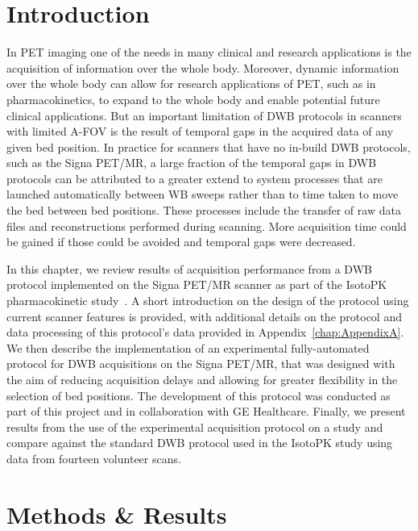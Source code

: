 \section{Introduction}
In PET imaging one of the needs in many clinical and research applications is the acquisition of information over the whole body. Moreover, dynamic information over the whole body can allow for research applications of PET, such as in pharmacokinetics, to expand to the whole body and enable potential future clinical applications. 
But an important limitation of DWB protocols in scanners with limited A-FOV is the result of temporal gaps in the acquired data of any given bed position.
In practice for scanners that have no in-build DWB protocols, such as the Signa PET/MR, a large fraction of the temporal gaps in DWB protocols can be attributed to a greater extend to system processes that are launched automatically between WB sweeps rather than to time taken to move the bed between bed positions. These processes include the transfer of raw data files and reconstructions performed during scanning. More acquisition time could be gained if those could be avoided and temporal gaps were decreased.

In this chapter, we review results of acquisition performance from a DWB protocol implemented on the Signa PET/MR scanner as part of the IsotoPK pharmacokinetic study~\cite{Marie2019}. A short introduction on the design of the protocol using current scanner features is provided, with additional details on the protocol and data processing of this protocol's data provided in Appendix~\ref{chap:AppendixA}.
We then describe the implementation of an experimental fully-automated protocol for DWB acquisitions on the Signa PET/MR, that was designed with the aim of reducing acquisition delays and allowing for greater flexibility in the selection of bed positions. The development of this protocol was conducted as part of this project and in collaboration with GE Healthcare. 
Finally, we present results from the use of the experimental acquisition protocol on a  study and compare against the standard DWB protocol used in the IsotoPK study using data from fourteen volunteer scans.

\section{Methods \& Results}

